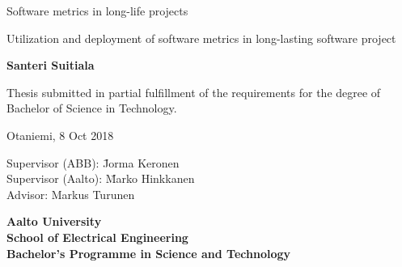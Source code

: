 {\parindent0pt %
\begin{spacing}{1.1}

 {\sffamily{}}
\end{spacing}

\vspace{12.7mm}

\begin{spacing}{1.63}
{\fontsize{17.8pt}{17.8pt}\selectfont Software metrics in long-life projects}
\end{spacing}

\vspace{10.5mm}

\begin{spacing}{1.2}
{\fontsize{13pt}{13pt}\selectfont Utilization and deployment of software metrics in long-lasting software project}
\end{spacing}

\vspace{10.6mm}

{\fontsize{13.9pt}{13.9pt}\bfseries\sffamily\lsstyle Santeri Suitiala}

\vfill

{\fontsize{10.3pt}{10.3pt}\sffamily\lsstyle\raggedright
\begin{spacing}{1.06}

Thesis submitted in partial fulfillment of the requirements for the
degree of Bachelor of Science in Technology.

Otaniemi, 8 Oct 2018

\begin{tabbing}
Supervisor (ABB):\hspace{6mm} \= Jorma Keronen \\
Supervisor (Aalto):\hspace{6mm} \= Marko Hinkkanen \\
Advisor: \> Markus Turunen
\end{tabbing}
\vspace{-4mm}
\end{spacing}
} %

\vspace{11.5mm}

\begin{spacing}{.9}
{\bfseries\sffamily\lsstyle Aalto University \\
School of Electrical Engineering \\
Bachelor’s Programme in Science and Technology}
\end{spacing}
} %



